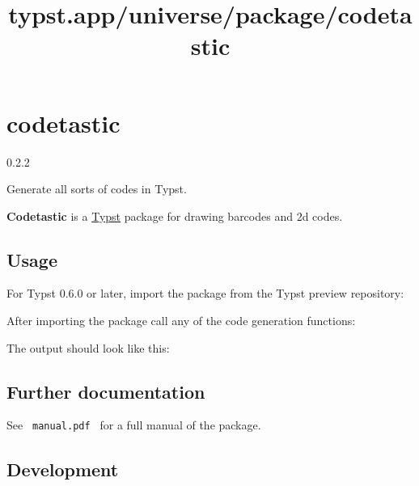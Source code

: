\title{typst.app/universe/package/codetastic}

\label{banner}
\section{codetastic}\label{codetastic}

{ 0.2.2 }

Generate all sorts of codes in Typst.

\label{readme}
\textbf{Codetastic} is a \href{https://github.com/typst/typst}{Typst}
package for drawing barcodes and 2d codes.

\subsection{Usage}\label{usage}

For Typst 0.6.0 or later, import the package from the Typst preview
repository:

\begin{Shaded}
\begin{Highlighting}[]
\end{Highlighting}
\end{Shaded}

After importing the package call any of the code generation functions:

\begin{Shaded}
\begin{Highlighting}[]


\end{Highlighting}
\end{Shaded}

The output should look like this:

\subsection{Further documentation}\label{further-documentation}

See \texttt{\ manual.pdf\ } for a full manual of the package.

\subsection{Development}\label{development}


